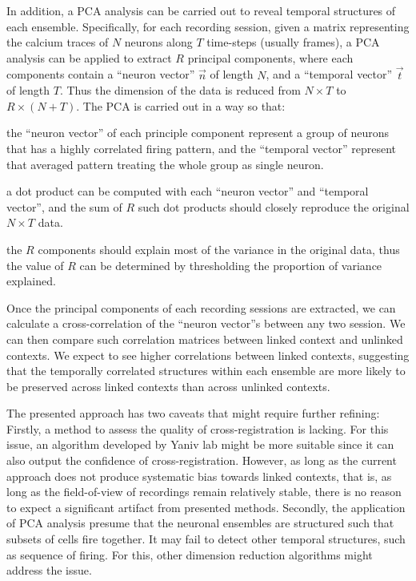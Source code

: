 \documentclass[master.tex]{subfiles}
\begin{document}
In addition, a PCA analysis can be carried out to reveal temporal structures of
each ensemble. Specifically, for each recording session, given a matrix
representing the calcium traces of $N$ neurons along $T$ time-steps (usually
frames), a PCA analysis can be applied to extract $R$ principal components,
where each components contain a ``neuron vector'' $\vec{n}$ of length $N$, and a
``temporal vector'' $\vec{t}$ of length $T$. Thus the dimension of the data is
reduced from $N \times T$ to $R \times (N + T)$. The PCA is carried out in a way
so that:
\begin{inparaenum}[a)]
\item the ``neuron vector'' of each principle component represent a group of
  neurons that has a highly correlated firing pattern, and the ``temporal
  vector'' represent that averaged pattern treating the whole group as single
  neuron.
\item a dot product can be computed with each ``neuron vector'' and ``temporal
  vector'', and the sum of $R$ such dot products should closely reproduce the
  original $N \times T$ data.
\item the $R$ components should explain most of the variance in the original
  data, thus the value of $R$ can be determined by thresholding the proportion
  of variance explained.
\end{inparaenum}

Once the principal components of each recording sessions are extracted, we can
calculate a cross-correlation of the ``neuron vector''s between any two session.
We can then compare such correlation matrices between linked context and
unlinked contexts. We expect to see higher correlations between linked contexts,
suggesting that the temporally correlated structures within each ensemble are
more likely to be preserved across linked contexts than across unlinked
contexts.

The presented approach has two caveats that might require further refining:
Firstly, a method to assess the quality of cross-registration is lacking. For
this issue, an algorithm developed by Yaniv lab might be more suitable since it
can also output the confidence of cross-registration. However, as long as the
current approach does not produce systematic bias towards linked contexts, that
is, as long as the field-of-view of recordings remain relatively stable, there
is no reason to expect a significant artifact from presented methods. Secondly,
the application of PCA analysis presume that the neuronal ensembles are
structured such that subsets of cells fire together. It may fail to detect other
temporal structures, such as sequence of firing. For this, other dimension
reduction algorithms might address the issue.
\end{document}
